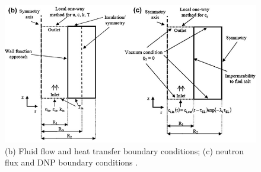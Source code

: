 \documentclass{article}
\begin{document}
\begin{figure}[htpb]
  \centering
  \includegraphics[max height=.5\textheight,max width=\textwidth,keepaspectratio]{Cammi_simplification_2.png}
  \caption{(b) Fluid flow and heat transfer boundary conditions; (c) neutron
        flux and DNP boundary conditions \cite{cammi_multi-physics_2011}.}
  \label{fig:simlification-2}
\end{figure}

\FloatBarrier
\clearpage
\printglossary[type=\acronymtype]


\end{document}
